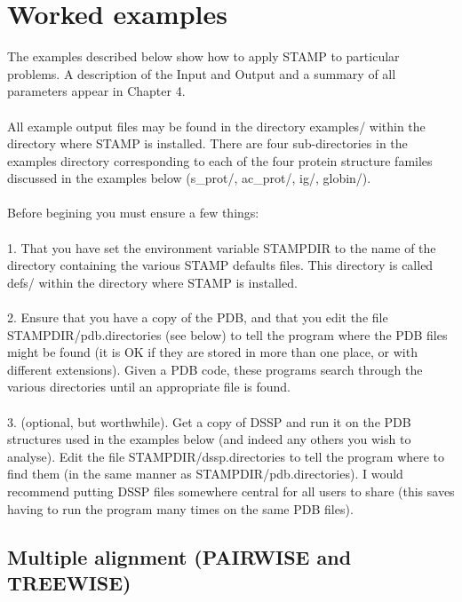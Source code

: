 \chapter{Worked examples}

The examples described below show how to apply STAMP to particular 
problems.  A description of the Input and Output and a summary
of all parameters appear in Chapter 4.\\
\\
All example output files may be found in the directory examples/ 
within the directory where STAMP is installed.   There are four sub-directories
in the examples directory corresponding to each of the four protein
structure familes discussed in the examples below (s\_prot/, ac\_prot/, ig/, globin/).\\
\\
Before begining you must ensure a few things:\\
\\
1. That you have set the environment variable STAMPDIR to the name of the 
directory containing the various STAMP defaults files.  This directory is
called defs/ within the directory where STAMP is installed. \\
\\
2. Ensure that you have a copy of the PDB, and that you edit the file
STAMPDIR/pdb.directories (see below) to tell the program where the PDB 
files might be found (it is OK if they are stored in more than one place, 
or with different extensions).   Given a PDB code, these programs search 
through the various directories until an appropriate file is found.\\
\\
3. (optional, but worthwhile).  Get a copy of DSSP and run it on the PDB
structures used in the examples below (and indeed any others you wish to analyse). 
Edit the file STAMPDIR/dssp.directories to tell the program where to find them (in the 
same manner as STAMPDIR/pdb.directories).  I would recommend putting DSSP files
somewhere central for all users to share (this saves having to run the program many
times on the same PDB files).

\section{Multiple alignment (PAIRWISE and TREEWISE)}


